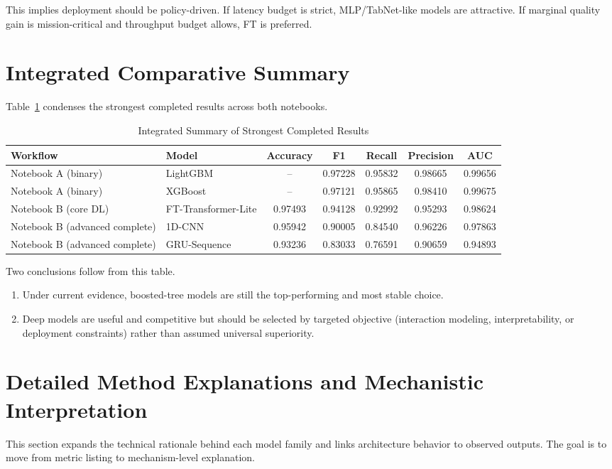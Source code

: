 \documentclass[10pt,journal]{IEEEtran}
\begin{document}
This implies deployment should be policy-driven. If latency budget is strict, MLP/TabNet-like models are attractive. If marginal quality gain is mission-critical and throughput budget allows, FT is preferred.

\section{Integrated Comparative Summary}
Table~\ref{tab:integrated_summary} condenses the strongest completed results across both notebooks.

\begin{table}[!t]
\caption{Integrated Summary of Strongest Completed Results}
\label{tab:integrated_summary}
\centering
\begin{tabular}{l l c c c c c}
\toprule
Workflow & Model & Accuracy & F1 & Recall & Precision & AUC \\
\midrule
Notebook A (binary) & LightGBM & -- & 0.97228 & 0.95832 & 0.98665 & 0.99656 \\
Notebook A (binary) & XGBoost & -- & 0.97121 & 0.95865 & 0.98410 & 0.99675 \\
Notebook B (core DL) & FT-Transformer-Lite & 0.97493 & 0.94128 & 0.92992 & 0.95293 & 0.98624 \\
Notebook B (advanced complete) & 1D-CNN & 0.95942 & 0.90005 & 0.84540 & 0.96226 & 0.97863 \\
Notebook B (advanced complete) & GRU-Sequence & 0.93236 & 0.83033 & 0.76591 & 0.90659 & 0.94893 \\
\bottomrule
\end{tabular}
\end{table}

Two conclusions follow from this table.

\begin{enumerate}
\item Under current evidence, boosted-tree models are still the top-performing and most stable choice.
\item Deep models are useful and competitive but should be selected by targeted objective (interaction modeling, interpretability, or deployment constraints) rather than assumed universal superiority.
\end{enumerate}

\section{Detailed Method Explanations and Mechanistic Interpretation}
This section expands the technical rationale behind each model family and links architecture behavior to observed outputs. The goal is to move from metric listing to mechanism-level explanation.
\end{document}
